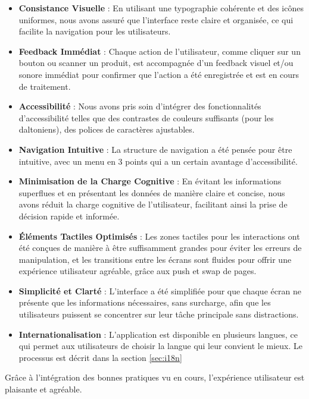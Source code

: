\begin{itemize}[noitemsep]
    \item \textbf{Consistance Visuelle} : En utilisant une typographie cohérente et des icônes uniformes, nous avons assuré que l'interface reste claire et organisée, ce qui facilite la navigation pour les utilisateurs.
    \item \textbf{Feedback Immédiat} : Chaque action de l'utilisateur, comme cliquer sur un bouton ou scanner un produit, est accompagnée d'un feedback visuel et/ou sonore immédiat pour confirmer que l'action a été enregistrée et est en cours de traitement.
    \item \textbf{Accessibilité} : Nous avons pris soin d'intégrer des fonctionnalités d'accessibilité telles que des contrastes de couleurs suffisants (pour les daltoniens), des polices de caractères ajustables.

    \item \textbf{Navigation Intuitive} : La structure de navigation a été pensée pour être intuitive, avec un menu en 3 points qui a un certain avantage d'accessibilité.

    \item \textbf{Minimisation de la Charge Cognitive} : En évitant les informations superflues et en présentant les données de manière claire et concise, nous avons réduit la charge cognitive de l'utilisateur, facilitant ainsi la prise de décision rapide et informée.

    \item \textbf{Éléments Tactiles Optimisés} : Les zones tactiles pour les interactions ont été conçues de manière à être suffisamment grandes pour éviter les erreurs de manipulation, et les transitions entre les écrans sont fluides pour offrir une expérience utilisateur agréable, grâce aux push et swap de pages.

    \item \textbf{Simplicité et Clarté} : L'interface a été simplifiée pour que chaque écran ne présente que les informations nécessaires, sans surcharge, afin que les utilisateurs puissent se concentrer sur leur tâche principale sans distractions.

    \item \textbf{Internationalisation} : L'application est disponible en plusieurs langues, ce qui permet aux utilisateurs de choisir la langue qui leur convient le mieux. Le processus est décrit dans la section \ref{sec:i18n}
\end{itemize}

Grâce à l'intégration des bonnes pratiques vu en cours, l'expérience utilisateur est plaisante et agréable.